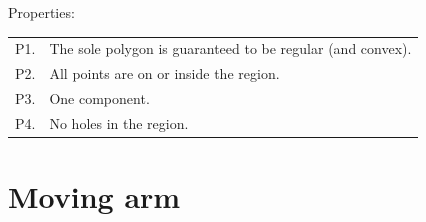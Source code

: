 %
Properties:
\\
\begin{tabular}{@{}ll@{}}
\toprule
P1. & The sole polygon is guaranteed to be regular (and convex).  \\  
P2. & All points are on or inside the region. \\ 
P3. & One component.  \\ 
P4. & No holes in the region.  \\  
\bottomrule
\end{tabular}



%
\section{Moving arm}

